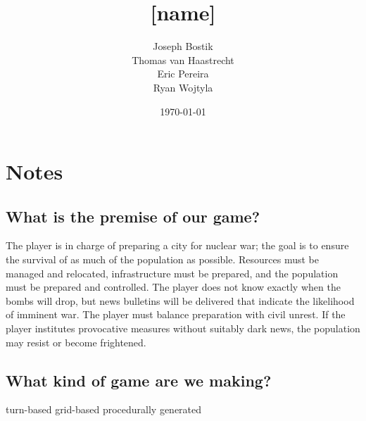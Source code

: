 \documentclass{article}
\begin{document}

\begin{titlepage}

  \title{[name]}
  \date{\today}
  \author{Joseph Bostik\\
    Thomas van Haastrecht\\
    Eric Pereira\\
    Ryan Wojtyla\\}

  \maketitle

\end{titlepage}



\section{Notes}

\subsection{What is the premise of our game?}

\begin{outline}[enumerate]
  \1 The player is in charge of preparing a city for nuclear war; the goal is to
  ensure the survival of as much of the population as possible.
  \1 Resources must be managed and relocated, infrastructure must be prepared,
  and the population must be prepared and controlled.
  \1 The player does not know exactly when the bombs will drop, but news
  bulletins will be delivered that indicate the likelihood of imminent war.
  \1 The player must balance preparation with civil unrest.
    \2 If the player institutes provocative measures without suitably
    dark news, the population may resist or become frightened.
\end{outline}

\subsection{What kind of game are we making?}

\begin{outline}[enumerate]
  \1 turn-based
  \1 grid-based
  \1 procedurally generated 
    \2 
\end{outline}

\end{document}
